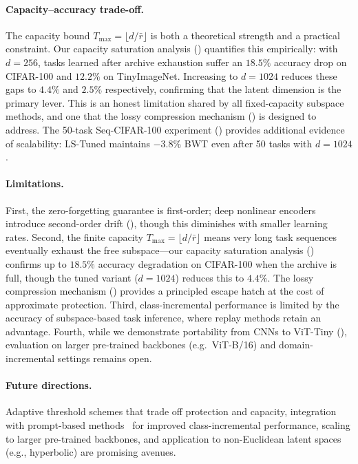 \documentclass{article}
\begin{document}
\paragraph{Capacity--accuracy trade-off.}
The capacity bound $T_{\max} = \lfloor d/\bar{r} \rfloor$ is both a
theoretical strength and a practical constraint. Our capacity saturation
analysis () quantifies this empirically:
with $d = 256$, tasks learned after archive exhaustion suffer an $18.5\%$
accuracy drop on CIFAR-100 and $12.2\%$ on TinyImageNet. Increasing to
$d = 1024$ reduces these gaps to $4.4\%$ and $2.5\%$ respectively, confirming
that the latent dimension is the primary lever. This is
an honest limitation shared by all fixed-capacity subspace methods, and one
that the lossy compression mechanism () is designed to
address. The 50-task Seq-CIFAR-100 experiment ()
provides additional evidence of scalability: LS-Tuned maintains $-3.8\%$ BWT
even after 50 tasks with $d = 1024$.

\paragraph{Limitations.}
First, the zero-forgetting guarantee is first-order; deep nonlinear
encoders introduce second-order drift (), though this
diminishes with smaller learning rates. Second, the finite capacity
$T_{\max} = \lfloor d/\bar{r} \rfloor$ means very long task sequences
eventually exhaust the free subspace---our capacity saturation analysis
() confirms up to $18.5\%$ accuracy degradation
on CIFAR-100 when the archive is full, though the tuned variant ($d = 1024$)
reduces this to $4.4\%$. The lossy compression mechanism () provides a
principled escape hatch at the cost of approximate protection.
Third, class-incremental performance is limited by the
accuracy of subspace-based task inference, where replay methods retain an
advantage. Fourth, while we demonstrate portability from CNNs to ViT-Tiny
(), evaluation on larger pre-trained backbones (e.g.\
ViT-B/16) and domain-incremental settings remains open.

\paragraph{Future directions.}
Adaptive threshold schemes that trade off protection and capacity,
integration with prompt-based methods~\citep{wang2022learning} for improved
class-incremental performance, scaling to larger pre-trained backbones, and
application to non-Euclidean latent spaces (e.g., hyperbolic) are promising
avenues.
\end{document}
